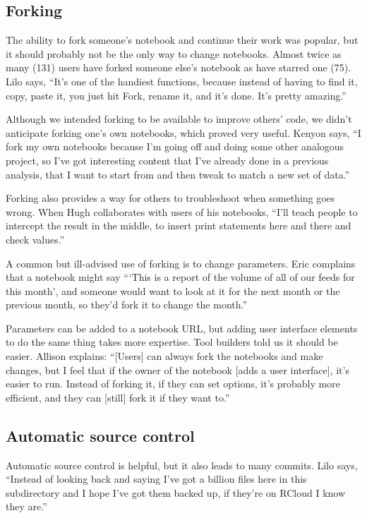 \subsection{Forking}
The ability to fork someone's notebook and continue their work was popular, but it
should probably not be the only way to change notebooks.
Almost twice as many (131) users have forked
someone else's notebook as have starred one (75). Lilo says, ``It's one of the
handiest functions, because instead of having to find it, copy, paste it, you
just hit Fork, rename it, and it's done. It's pretty amazing.''

Although we intended forking to be available to improve others' code, we
didn't anticipate forking one's own notebooks, which
proved very useful. Kenyon says, ``I fork my own notebooks because I'm going off
and doing some other analogous project, so I've got interesting content that I've
already done in a previous analysis, that I want to start from and then tweak
to match a new set of data.''

Forking also provides a way for others to troubleshoot when something goes
wrong. When Hugh collaborates with users of his notebooks, ``I'll teach people
to intercept the result in the middle, to insert print statements here and
there and check values.''

A common but ill-advised use of forking is to change
parameters. Eric complains that a notebook might say ```This is a report of
the volume of all of our feeds for this month', and someone would want to
look at it for the next month or the previous month, so they'd fork it to
change the month.''

Parameters can be added to a notebook URL, but adding user interface
elements to do the same thing takes more expertise. Tool builders told us it
should be easier. Allison explains: ``[Users] can always fork the notebooks
and make changes, but I
feel that if the owner of the notebook [adds a user interface], it's easier to
run. Instead of forking it, if they can set options, it's probably more
efficient, and they can [still] fork it if they want to.''

\subsection{Automatic source control}
Automatic source control is helpful, but it also leads to many commits. Lilo says, ``Instead of
looking back and saying I've got a billion files here in this subdirectory and I
hope I've got them backed up, if they're on RCloud I know they are.''

